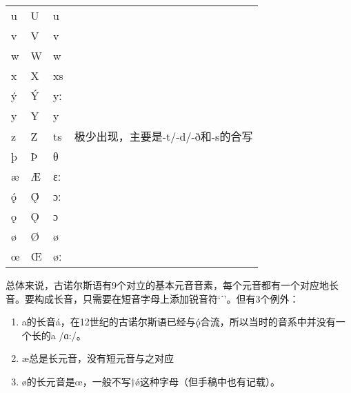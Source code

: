 \begin{table}[H]
\begin{tabular}{@{}llll@{}}
        u        & U        & u                &                                                              \\
        v        & V        & v                &                                                              \\
        w        & W        & w                &                                                              \\
        x        & X        & xs               &                                                              \\
        ý        & Ý        & yː               &                                                              \\
        y        & Y        & y                &                                                              \\
        z        & Z        & ts               & 极少出现，主要是-t/-d/-ð和-s的合写                           \\
        þ        & Þ        & θ                &                                                              \\
        æ        & Æ        & ɛː               &                                                              \\
        ǫ́        & Ǫ́        & ɔː               &                                                              \\
        ǫ        & Ǫ        & ɔ                &                                                              \\
        ø        & Ø        & ø                &                                                              \\
        œ        & Œ        & øː               &                                                              \\ \bottomrule
    \end{tabular}
\end{table}

总体来说，古诺尔斯语有9个对立的基本元音音素，每个元音都有一个对应地长音。要构成长音，只需要在短音字母上添加锐音符`ˊ'。但有3个例外：
\begin{info}
    \begin{enumerate}[leftmargin=*]
        \item a的长音á，在12世纪的古诺尔斯语已经与ǫ́合流，所以当时的音系中并没有一个长的a /ɑ:/。
        \item æ总是长元音，没有短元音与之对应 \footnotemark
        \item ø的长元音是œ，一般不写†\'{ø}这种字母（但手稿中也有记载）。
    \end{enumerate}
\end{info}

